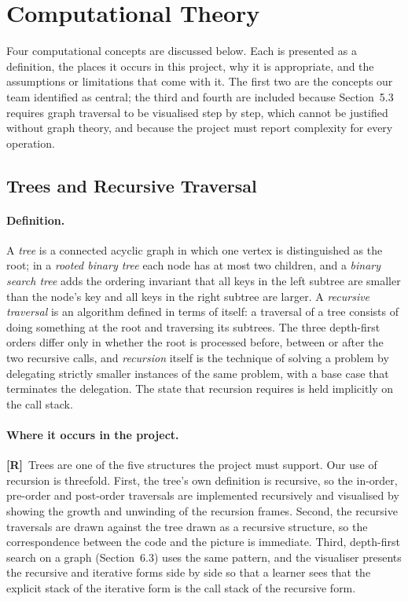 \documentclass[11pt,a4paper]{article}
\newcommand{\R}{\textcolor{reqc}{\textbf{[R]}}}     %
\begin{document}
\section{Computational Theory}

Four computational concepts are discussed below. Each is presented as a definition, the
places it occurs in this project, why it is appropriate, and the assumptions or limitations
that come with it. The first two are the concepts our team identified as central; the third
and fourth are included because Section~5.3 requires graph traversal to be visualised step by
step, which cannot be justified without graph theory, and because the project must report
complexity for every operation.

\subsection{Trees and Recursive Traversal}

\paragraph{Definition.} A \emph{tree} is a connected acyclic graph in which one vertex is
distinguished as the root; in a \emph{rooted binary tree} each node has at most two
children, and a \emph{binary search tree} adds the ordering invariant that all keys in the
left subtree are smaller than the node's key and all keys in the right subtree are larger. A
\emph{recursive traversal} is an algorithm defined in terms of itself: a traversal of a tree
consists of doing something at the root and traversing its subtrees. The three depth-first
orders differ only in whether the root is processed before, between or after the two
recursive calls, and \emph{recursion} itself is the technique of solving a problem by
delegating strictly smaller instances of the same problem, with a base case that terminates
the delegation. The state that recursion requires is held implicitly on the call stack.

\paragraph{Where it occurs in the project.} \R\ Trees are one of the five structures the
project must support. Our use of recursion is threefold. First, the tree's own definition is
recursive, so the in-order, pre-order and post-order traversals are implemented recursively
and visualised by showing the growth and unwinding of the recursion frames. Second, the
recursive traversals are drawn against the tree drawn as a recursive structure, so the
correspondence between the code and the picture is immediate. Third, depth-first search on a
graph (Section~6.3) uses the same pattern, and the visualiser presents the recursive and
iterative forms side by side so that a learner sees that the explicit stack of the iterative
form is the call stack of the recursive form.
\end{document}
